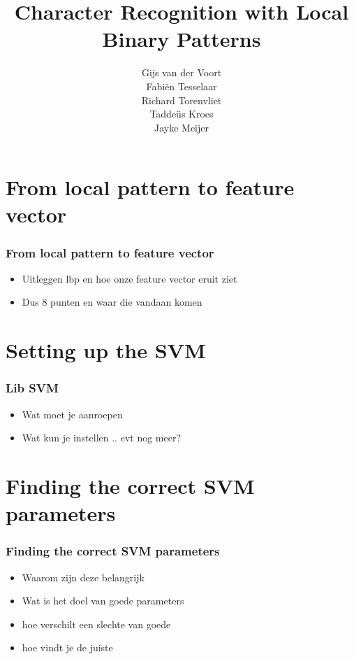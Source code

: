 \documentclass{beamer}
\author{
  Gijs van der Voort\\
  Fabi\"en Tesselaar\\
  Richard Torenvliet\\
  Tadde\"us Kroes\\
  Jayke Meijer
}
\title{Character Recognition with Local Binary Patterns}
\begin{document}
  \begin{frame}
    \titlepage
  \end{frame}

  \section{From local pattern to feature vector}
		
  \begin{frame}
    \frametitle{From local pattern to feature vector}

    \begin{itemize}
    \item Uitleggen lbp en hoe onze feature vector eruit ziet
    \pause
    \item Dus 8 punten en waar die vandaan komen
    \end{itemize}
  \end{frame}

  \section{Setting up the SVM}

  \begin{frame}
    \frametitle{Lib SVM}

    \begin{itemize}
      \item Wat moet je aanroepen
      \pause
      \item Wat kun je instellen .. evt nog meer?
    \end{itemize}
  \end{frame}

  \section{Finding the correct SVM parameters}

  \begin{frame}
    \frametitle{Finding the correct SVM parameters}
    \begin{itemize}
      \item Waarom zijn deze belangrijk
      \pause
      \item Wat is het doel van goede parameters
      \pause
      \item hoe verschilt een slechte van goede 
      \pause
      \item hoe vindt je de juiste
    \end{itemize}
  \end{frame}
\end{document}
